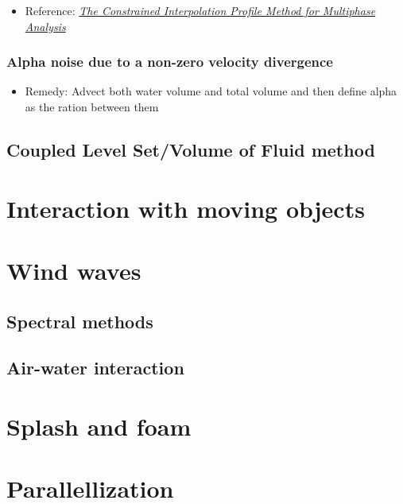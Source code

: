 \documentclass[a4paper]{report}
\begin{document}

\begin{itemize}
    \item Reference: \textit{\href{http://www.mech.titech.ac.jp/~ryuutai/paper/JCP2001CIPReviewYabe.pdf}{The Constrained Interpolation Profile Method for Multiphase Analysis}}
\end{itemize}

\subsection{Alpha noise due to a non-zero velocity divergence}

\begin{itemize}
    \item Remedy: Advect both water volume and total volume and then define alpha as the ration between them
\end{itemize}

\section{Coupled Level Set/Volume of Fluid  method}

\chapter{Interaction with moving objects}

\chapter{Wind waves}

\section{Spectral methods}

\section{Air-water interaction}

\chapter{Splash and foam}

\chapter{Parallellization}
\end{document}
